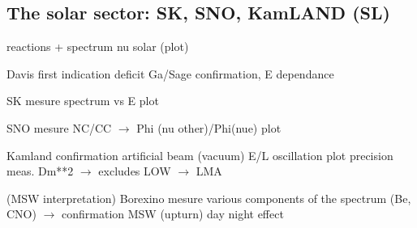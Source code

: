 \subsection{The solar sector: SK, SNO, KamLAND  (SL)}
\label{sec:solar}

reactions + spectrum nu solar (plot)

Davis first indication deficit Ga/Sage confirmation, E dependance

SK mesure spectrum vs E plot

SNO mesure NC/CC  $\rightarrow$ Phi (nu other)/Phi(nue) plot

Kamland confirmation artificial beam (vacuum) E/L oscillation plot precision meas. Dm**2 $\rightarrow$ excludes LOW  $\rightarrow$ LMA 

(MSW interpretation) Borexino  mesure various components of the spectrum (Be, CNO) $\rightarrow$ confirmation MSW (upturn) day night effect

